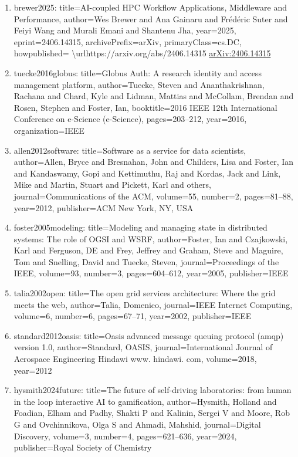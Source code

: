 \documentclass[11pt]{article}
\begin{document}
\begin{enumerate}[leftmargin=*]
  \item brewer2025: title=AI-coupled HPC Workflow Applications, Middleware and Performance, author=Wes Brewer and Ana Gainaru and Frédéric Suter and Feiyi Wang and Murali Emani and Shantenu Jha, year=2025, eprint=2406.14315, archivePrefix=arXiv, primaryClass=cs.DC, howpublished= \textbackslash{}urlhttps://arxiv.org/abs/2406.14315 \href{https://arxiv.org/abs/2406.14315}{arXiv:2406.14315}
  \item tuecke2016globus: title=Globus Auth: A research identity and access management platform, author=Tuecke, Steven and Ananthakrishnan, Rachana and Chard, Kyle and Lidman, Mattias and McCollam, Brendan and Rosen, Stephen and Foster, Ian, booktitle=2016 IEEE 12th International Conference on e-Science (e-Science), pages=203--212, year=2016, organization=IEEE
  \item allen2012software: title=Software as a service for data scientists, author=Allen, Bryce and Bresnahan, John and Childers, Lisa and Foster, Ian and Kandaswamy, Gopi and Kettimuthu, Raj and Kordas, Jack and Link, Mike and Martin, Stuart and Pickett, Karl and others, journal=Communications of the ACM, volume=55, number=2, pages=81--88, year=2012, publisher=ACM New York, NY, USA
  \item foster2005modeling: title=Modeling and managing state in distributed systems: The role of OGSI and WSRF, author=Foster, Ian and Czajkowski, Karl and Ferguson, DE and Frey, Jeffrey and Graham, Steve and Maguire, Tom and Snelling, David and Tuecke, Steven, journal=Proceedings of the IEEE, volume=93, number=3, pages=604--612, year=2005, publisher=IEEE
  \item talia2002open: title=The open grid services architecture: Where the grid meets the web, author=Talia, Domenico, journal=IEEE Internet Computing, volume=6, number=6, pages=67--71, year=2002, publisher=IEEE
  \item standard2012oasis: title=Oasis advanced message queuing protocol (amqp) version 1.0, author=Standard, OASIS, journal=International Journal of Aerospace Engineering Hindawi www. hindawi. com, volume=2018, year=2012
  \item hysmith2024future: title=The future of self-driving laboratories: from human in the loop interactive AI to gamification, author=Hysmith, Holland and Foadian, Elham and Padhy, Shakti P and Kalinin, Sergei V and Moore, Rob G and Ovchinnikova, Olga S and Ahmadi, Mahshid, journal=Digital Discovery, volume=3, number=4, pages=621--636, year=2024, publisher=Royal Society of Chemistry

\end{enumerate}
\end{document}
